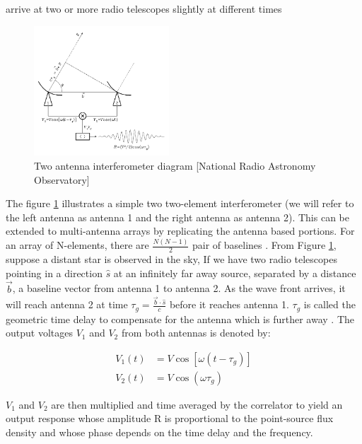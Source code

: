 arrive at two or more radio telescopes slightly at different times
\begin{figure}[h!]
  \centering
    \includegraphics[width=0.45\textwidth]{images/Rint.png}
    \caption{Two antenna interferometer diagram [National Radio Astronomy Observatory]}
  \label{images/Rint.png}
\end{figure}

The figure \ref{images/Rint.png} illustrates a simple two two-element interferometer (we will refer to the left antenna as antenna 1 and the right antenna as antenna 2). This can be extended to multi-antenna arrays by replicating the antenna based portions. For an array of N-elements, there are $\frac{N(N-1)}{2}$ pair of baselines \citep{zensus1995very}. From Figure \ref{images/Rint.png}, suppose a distant star is observed in the sky, If we have two radio telescopes pointing in a direction $\widehat{s}$ at an infinitely far away source, separated by a distance $\overrightarrow{b}$, a  baseline vector from antenna 1 to antenna 2. As the wave front arrives, it will reach antenna 2 at time $\tau_{g}=\frac{\overrightarrow{b}\cdot\widehat{s}}{c}$ before it reaches antenna 1. $\tau_{g}$ is called the geometric time delay to compensate for the antenna which is further away \citep{taylor1999synthesis}. The output voltages $V_1$ and $V_2$ from both antennas is  denoted by: 

\begin{equation}\label{eq111}
\begin{split}
V_1(t)&=V\cos[\omega(t-\tau_{g})] \\
V_2(t)&=V\cos(\omega\tau_{g})
\end{split}
\end{equation}

$V_1$ and $V_2$ are then  multiplied and time averaged by the correlator to yield an output response whose amplitude R is proportional to the point-source flux density and whose phase depends on the time delay and the frequency.

